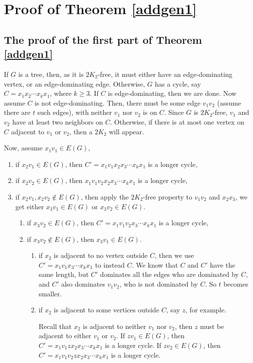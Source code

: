 \documentclass{amsart}
\theoremstyle{definition}
\begin{document}
\section{Proof of Theorem \ref{addgen1}}

\subsection{The proof of the first part of Theorem \ref{addgen1}}
If $G$ is a tree, then, as it is $2K_2$-free, it must either have an edge-dominating
vertex, or an edge-dominating edge.
Otherwise, $G$ has a cycle, say $C=x_1x_2\cdots x_kx_1$, where $k\ge3$.
If $C$ is edge-dominating, then we are done. 
Now assume $C$ is not edge-dominating. Then, there must be some edge $v_1v_2$ (assume there are $t$ such edges), with neither $v_1$ nor $v_2$ is on $C$. 
Since $G$ is $2K_2$-free, $v_1$ and $v_2$ have at least two neighbors on $C$. Otherwise, if there is at most one vertex on $C$ adjacent to $v_1$ or $v_2$, then a $2K_2$ will appear.

Now, assume $x_1v_1\in E(G)$, 
\begin{enumerate}
\item if $x_2v_1\in E(G)$, then $C'=x_1v_1x_2x_3\cdots x_kx_1$ is a longer cycle,
\item if $x_2v_2\in E(G)$, then $x_1v_1v_2x_2x_3\cdots x_kx_1$ is a longer cycle, 
\item if $x_2v_1,x_2v_2\not\in E(G)$, then apply the $2K_2$-free property to $v_1v_2$ and $x_2x_3$, we get either $x_3v_1\in E(G)$ or $x_3v_2\in E(G)$.
\begin{enumerate}
\item if $x_3v_2\in E(G)$, then $C'=x_1v_1v_2x_3\cdots x_kx_1$ is a longer cycle,
\item if $x_3v_2\not\in E(G)$, then $x_3v_1\in E(G)$.
\begin{enumerate}
\item if $x_2$ is adjacent to no vertex outside $C$, then we use $C'=x_1v_1x_3\cdots x_kx_1$ to instead $C$. We know that $C$ and $C'$ have the same length, but $C'$ dominates all the edges who are dominated by $C$, and $C'$ also dominates $v_1v_2$, who is not dominated by $C$. So $t$ becomes smaller.
\item if $x_2$ is adjacent to some vertices outside $C$, say $z$, for example.

Recall that $x_2$ is adjacent to neither $v_1$ nor $v_2$, then $z$ must be adjacent to either $v_1$ or $v_2$. If $zv_1\in E(G)$, then $C'=x_1v_1zx_2x_3\cdots x_kx_1$ is a longer cycle.
If $zv_2\in E(G)$, then $C'=x_1v_1v_2zx_2x_3\cdots x_kx_1$ is a longer cycle.
\end{enumerate}

\end{enumerate}
\end{enumerate}
\end{document}
